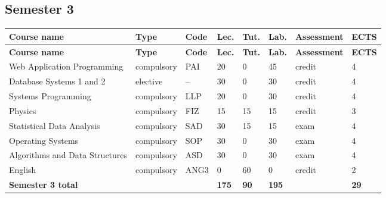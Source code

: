\documentclass[12pt,a4paper]{article}
\newcommand{\thdrule}{\noalign{\global\setlength{\extrarowheight}{0pt}}}
\newcommand{\thdend}{\noalign{\global\setlength{\extrarowheight}{4pt}}}
\begin{document}
\subsection*{Semester 3}

{\scriptsize
\begin{longtable}{m{5.0cm}m{1.9cm}m{0.75cm}m{0.85cm}m{0.85cm}m{0.85cm}m{1.45cm}m{0.9cm}}
\thdrule\toprule
\rowcolor{pjatkRed}
{\color{white}\footnotesize\textbf{\vphantom{Ag}Course name}} & {\color{white}\footnotesize\textbf{\vphantom{Ag}Type}} & {\color{white}\footnotesize\textbf{\vphantom{Ag}Code}} & {\color{white}\footnotesize\textbf{\vphantom{Ag}Lec.}} & {\color{white}\footnotesize\textbf{\vphantom{Ag}Tut.}} & {\color{white}\footnotesize\textbf{\vphantom{Ag}Lab.}} & {\color{white}\footnotesize\textbf{\vphantom{Ag}Assessment}} & {\color{white}\footnotesize\textbf{\vphantom{Ag}ECTS}} \\
\midrule\thdend
\endfirsthead
\thdrule\toprule
\rowcolor{pjatkRed}
{\color{white}\footnotesize\textbf{\vphantom{Ag}Course name}} & {\color{white}\footnotesize\textbf{\vphantom{Ag}Type}} & {\color{white}\footnotesize\textbf{\vphantom{Ag}Code}} & {\color{white}\footnotesize\textbf{\vphantom{Ag}Lec.}} & {\color{white}\footnotesize\textbf{\vphantom{Ag}Tut.}} & {\color{white}\footnotesize\textbf{\vphantom{Ag}Lab.}} & {\color{white}\footnotesize\textbf{\vphantom{Ag}Assessment}} & {\color{white}\footnotesize\textbf{\vphantom{Ag}ECTS}} \\
\midrule\thdend
\endhead
\rowcolor{tableRowLight} Web Application Programming & {\scriptsize compulsory} & PAI & 20 & 0 & 45 & {\scriptsize credit} & 4 \\
\rowcolor{tableElective} Database Systems 1 and 2 & {\scriptsize elective} & -- & 30 & 0 & 30 & {\scriptsize credit} & 4 \\
\rowcolor{tableRowAlt} Systems Programming & {\scriptsize compulsory} & LLP & 20 & 0 & 30 & {\scriptsize credit} & 4 \\
\rowcolor{tableRowLight} Physics & {\scriptsize compulsory} & FIZ & 15 & 15 & 15 & {\scriptsize credit} & 3 \\
\rowcolor{tableRowAlt} Statistical Data Analysis & {\scriptsize compulsory} & SAD & 30 & 15 & 15 & {\scriptsize exam} & 4 \\
\rowcolor{tableRowLight} Operating Systems & {\scriptsize compulsory} & SOP & 30 & 0 & 30 & {\scriptsize exam} & 4 \\
\rowcolor{tableRowAlt} Algorithms and Data Structures & {\scriptsize compulsory} & ASD & 30 & 0 & 30 & {\scriptsize exam} & 4 \\
\rowcolor{tableRowLight} English & {\scriptsize compulsory} & ANG3 & 0 & 60 & 0 & {\scriptsize credit} & 2 \\
\midrule[\heavyrulewidth]
\rowcolor{tableSummary} \textbf{Semester 3 total} & & & \textbf{175} & \textbf{90} & \textbf{195} & & \textbf{29} \\
\bottomrule
\end{longtable}}
\end{document}

